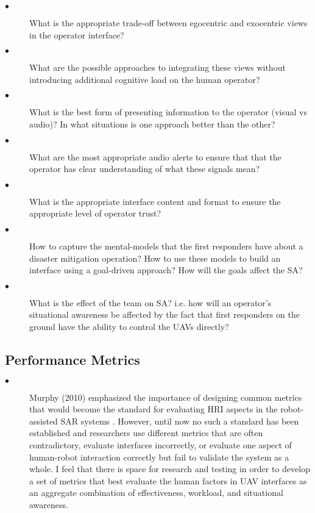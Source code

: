 \documentclass[12pt, letterpaper, oneside]{article}
\begin{document}
\begin{description}

	\item[$\bullet$] 
	What is the appropriate trade-off between egocentric and exocentric views in the operator interface? 
	\item[$\bullet$] 
	What are the possible approaches to integrating these views without introducing additional cognitive load on the human operator?
	\item[$\bullet$] 
	What is the best form of presenting information to the operator (visual vs audio)? In what situations is one approach better than the other?
	\item[$\bullet$] 
	What are the most appropriate audio alerts to ensure that that the operator has clear understanding of what these signals mean? 
	\item[$\bullet$] 
	What is the appropriate interface content and format to ensure the appropriate level of operator trust? 
	\item[$\bullet$] 
	How to capture the mental-models that the first responders have about a disaster mitigation operation? How to use these models to build an interface using a goal-driven approach? How will the goals affect the SA? 
	\item[$\bullet$] 
	What is the effect of the team on SA? i.e. how will an operator's situational awareness be affected by the fact that first responders on the ground have the ability to control the UAVs directly? 
	
\end{description}

\subsection{Performance Metrics}

\begin{description}
	\item[$\bullet$] 
Murphy (2010) emphasized the importance of designing common metrics that would become the standard for evaluating HRI aspects in the robot-assisted SAR systems \cite{28}. However, until now no such a standard has been established and researchers use different metrics that are often contradictory, evaluate interfaces incorrectly, or evaluate one aspect of human-robot interaction correctly but fail to validate the system as a whole. I feel that there is space for research and testing in order to develop a set of metrics that best evaluate the human factors in UAV interfaces as an aggregate combination of effectiveness, workload, and situational awareness. 

\end{description}

\medskip
\pagebreak



\end{document}
